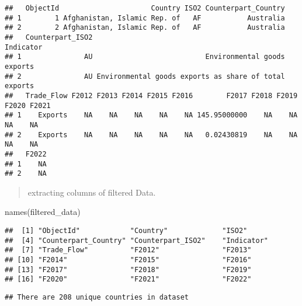 \documentclass[
]{article}
\newenvironment{Shaded}{\begin{snugshade}}{\end{snugshade}}
\newcommand{\FunctionTok}[1]{\textcolor[rgb]{0.00,0.00,0.00}{#1}}
\newcommand{\NormalTok}[1]{#1}
\newcommand{\OtherTok}[1]{\textcolor[rgb]{0.56,0.35,0.01}{#1}}
\newcommand{\SpecialCharTok}[1]{\textcolor[rgb]{0.00,0.00,0.00}{#1}}
\newcommand{\StringTok}[1]{\textcolor[rgb]{0.31,0.60,0.02}{#1}}
\begin{document}
\begin{verbatim}
##   ObjectId                      Country ISO2 Counterpart_Country
## 1        1 Afghanistan, Islamic Rep. of   AF           Australia
## 2        2 Afghanistan, Islamic Rep. of   AF           Australia
##   Counterpart_ISO2                                             Indicator
## 1               AU                           Environmental goods exports
## 2               AU Environmental goods exports as share of total exports
##   Trade_Flow F2012 F2013 F2014 F2015 F2016        F2017 F2018 F2019 F2020 F2021
## 1    Exports    NA    NA    NA    NA    NA 145.95000000    NA    NA    NA    NA
## 2    Exports    NA    NA    NA    NA    NA   0.02430819    NA    NA    NA    NA
##   F2022
## 1    NA
## 2    NA
\end{verbatim}

\begin{quote}
extracting columns of filtered Data.
\end{quote}

\begin{Shaded}
\begin{Highlighting}[]
\FunctionTok{names}\NormalTok{(filtered\_data)}
\end{Highlighting}
\end{Shaded}

\begin{verbatim}
##  [1] "ObjectId"            "Country"             "ISO2"               
##  [4] "Counterpart_Country" "Counterpart_ISO2"    "Indicator"          
##  [7] "Trade_Flow"          "F2012"               "F2013"              
## [10] "F2014"               "F2015"               "F2016"              
## [13] "F2017"               "F2018"               "F2019"              
## [16] "F2020"               "F2021"               "F2022"
\end{verbatim}

\begin{Shaded}
\end{Shaded}

\begin{verbatim}
## There are 208 unique countries in dataset
\end{verbatim}
\end{document}
